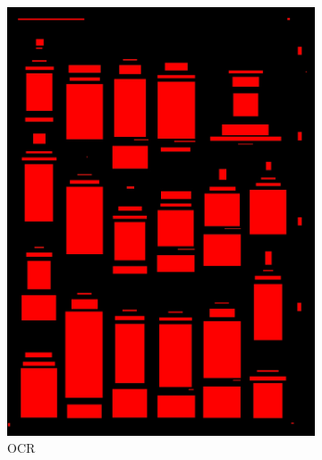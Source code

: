 \documentclass[aspectratio=1610]{beamer}
\begin{document}
\begin{frame}
  \begin{figure}
\centering
\begin{subfigure}{.25\textwidth}
  \centering
  \includegraphics[width=0.99\linewidth, clip=true, trim = 0mm 0mm 0mm 0mm]{figures/ocr/GQU6vjW.jpg}
  \caption{OCR}
\end{subfigure}%
\begin{subfigure}{.25\textwidth}
  \centering

\end{subfigure}
\end{figure}
\end{frame}
\end{document}
